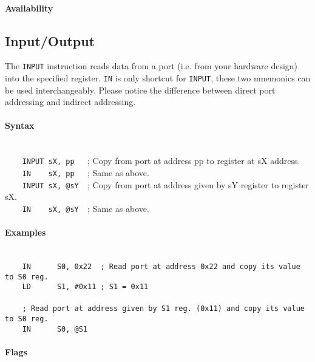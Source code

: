         \paragraph{Availability}
            \pbavailability{\yes}{\no}{\no}{\no}{\no}

\clearpage
\subsection{Input/Output}
        The \texttt{INPUT} instruction reads data from a port (i.e. from your hardware design) into the specified register. \texttt{IN} is only shortcut for \texttt{INPUT}, these two mnemonics can be used interchangeably. Please notice the difference between direct port addressing and indirect addressing.

        \paragraph{Syntax}
            ~\\
            \verb'    INPUT sX, pp   '; Copy from port at address pp to register at sX address.\\
            \verb'    IN    sX, pp   '; Same as above.\\
            \verb'    INPUT sX, @sY  '; Copy from port at address given by sY register to register sX.\\
            \verb'    IN    sX, @sY  '; Same as above.

        \paragraph{Examples}
            ~\\
            \verb'    IN      S0, 0x22  ; Read port at address 0x22 and copy its value to S0 reg.'\\
            \verb'    LD      S1, #0x11 ; S1 = 0x11'\\
            \verb''\\
            \verb'    ; Read port at address given by S1 reg. (0x11) and copy its value to S0 reg.'\\
            \verb'    IN      S0, @S1'\\

        \paragraph{Flags}

